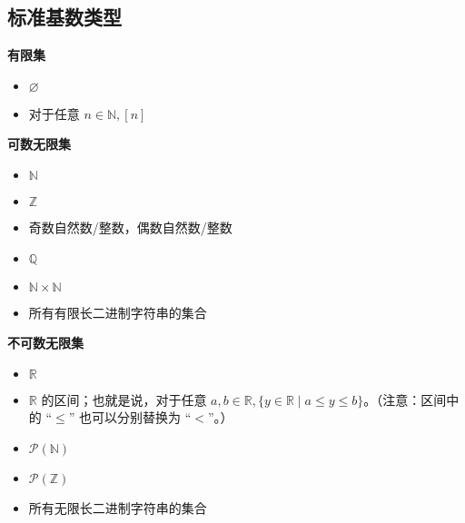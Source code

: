 \subsection{标准基数类型}

\textbf{有限集}

\begin{itemize}
    \item $\varnothing$
    \item 对于任意 $n \in \mathbb{N}, [n]$
\end{itemize}


\textbf{可数无限集}

\begin{itemize}
    \item $\mathbb{N}$
    \item $\mathbb{Z}$
    \item 奇数自然数/整数，偶数自然数/整数
    \item $\mathbb{Q}$
    \item $\mathbb{N} \times \mathbb{N}$
    \item 所有有限长二进制字符串的集合
\end{itemize}


\textbf{不可数无限集}

\begin{itemize}
    \item $\mathbb{R}$
    \item $\mathbb{R}$ 的区间；也就是说，对于任意 $a, b \in \mathbb{R}, \{y \in \mathbb{R} \mid a \le y \le b\}$。（注意：区间中的 ``$\le$'' 也可以分别替换为 ``$<$''。）
    \item $\mathcal{P}(\mathbb{N})$
    \item $\mathcal{P}(\mathbb{Z})$
    \item 所有无限长二进制字符串的集合
\end{itemize}

